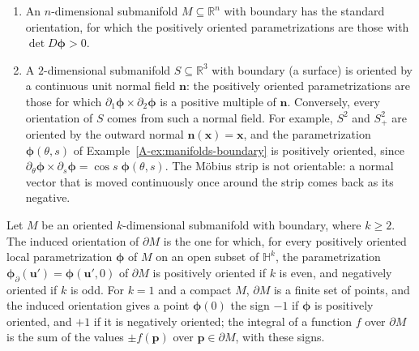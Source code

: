 \begin{example}\label{A-ex:orientations}
    \begin{enumerate}
        \item An $n$-dimensional submanifold $M \subseteq \mathbb{R}^n$ with boundary has the standard orientation, for which the positively oriented parametrizations are those with $\det D\boldsymbol{\phi} > 0$.
        \item A $2$-dimensional submanifold $S \subseteq \mathbb{R}^3$ with boundary (a surface) is oriented by a continuous unit normal field $\mathbf{n}$: the positively oriented parametrizations are those for which $\partial_1\boldsymbol{\phi} \times \partial_2\boldsymbol{\phi}$ is a positive multiple of $\mathbf{n}$. Conversely, every orientation of $S$ comes from such a normal field. For example, $S^2$ and $S^2_+$ are oriented by the outward normal $\mathbf{n}(\mathbf{x}) = \mathbf{x}$, and the parametrization $\boldsymbol{\phi}(\theta, s)$ of Example~\ref{A-ex:manifolds-boundary} is positively oriented, since $\partial_\theta\boldsymbol{\phi} \times \partial_s\boldsymbol{\phi} = \cos s\; \boldsymbol{\phi}(\theta, s)$. The M\"obius strip is not orientable: a normal vector that is moved continuously once around the strip comes back as its negative.
    \end{enumerate}
\end{example}

\begin{definition}\label{A-def:boundary-orientation}
    Let $M$ be an oriented $k$-dimensional submanifold with boundary, where $k \geq 2$. The induced orientation of $\partial M$ is the one for which, for every positively oriented local parametrization $\boldsymbol{\phi}$ of $M$ on an open subset of $\mathbb{H}^k$, the parametrization $\boldsymbol{\phi}_\partial(\mathbf{u}') = \boldsymbol{\phi}(\mathbf{u}', 0)$ of $\partial M$ is positively oriented if $k$ is even, and negatively oriented if $k$ is odd. For $k = 1$ and a compact $M$, $\partial M$ is a finite set of points, and the induced orientation gives a point $\boldsymbol{\phi}(0)$ the sign $-1$ if $\boldsymbol{\phi}$ is positively oriented, and $+1$ if it is negatively oriented; the integral of a function $f$ over $\partial M$ is the sum of the values $\pm f(\mathbf{p})$ over $\mathbf{p} \in \partial M$, with these signs.
\end{definition}

